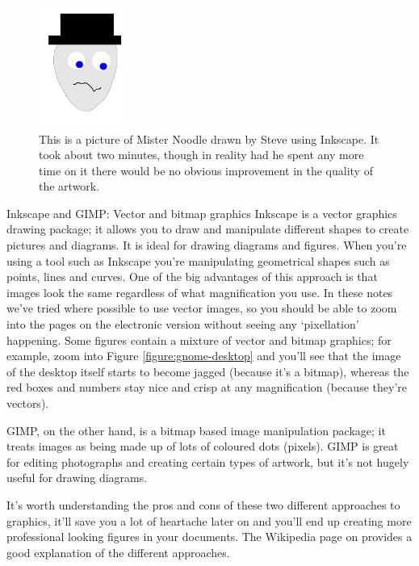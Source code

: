\begin{figure}[t]
\centerline{\includegraphics[width=0.25\textwidth]{images/mrnoodle}}
\caption{This is a picture of Mister Noodle drawn by Steve using Inkscape. It took about two minutes, though in reality had he spent any more time on it there would be no obvious improvement in the quality of the artwork.}\label{figure:mrnoodle}
\end{figure}

\begin{diversion}{Inkscape and GIMP: Vector and bitmap graphics}
Inkscape is a vector graphics drawing package; it allows you to draw and manipulate different shapes to create pictures and diagrams. It is ideal for drawing diagrams and figures. When you're using a tool such as Inkscape you're manipulating geometrical shapes such as points, lines and curves. One of the big advantages of this approach is that images look the same regardless of what magnification you use. In these notes we've tried where possible to use vector images, so you should be able to zoom into the pages on the electronic version without seeing any `pixellation' happening. Some figures contain a mixture of vector and bitmap graphics; for example, zoom into Figure \ref{figure:gnome-desktop} and you'll see that the image of the desktop itself starts to become jagged (because it's a bitmap), whereas the red boxes and numbers stay nice and crisp at any magnification (because they're vectors).

GIMP, on the other hand, is a bitmap based image manipulation package; it treats images as being made up of lots of coloured dots (pixels). GIMP is great for editing photographs and creating certain types of artwork, but it's not hugely useful for drawing diagrams. 

It's worth understanding the pros and cons of these two different approaches to graphics, it'll save you a lot of heartache later on and you'll end up creating more professional looking figures in your documents. The Wikipedia page on  provides a good explanation of the different approaches.

\end{diversion}

